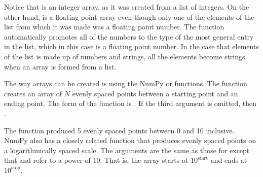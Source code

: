 \documentclass[letterpaper,10pt,english]{sphinxmanual}
\begin{document}
\sphinxAtStartPar
Notice that  is an integer array, as it was created from a list of integers.  On the other hand,  is a floating point array even though only one of the elements of the list from which it was made was a floating point number.  The  function automatically promotes all of the numbers to the type of the most general entry in the list, which in this case is a floating point number. In the case that elements of the list is made up of numbers and strings, all the elements become strings when an array is formed from a list.

\sphinxAtStartPar
The  way arrays can be created is using the NumPy  or  functions.  The  function creates an array of \(N\) evenly spaced points between a starting point and an ending point.  The form of the function is .  If the third argument  is omitted, then .

\begin{sphinxVerbatim}[commandchars=\\\{\}]
  
\PYG{p}{[}            \PYG{p}{]}
\end{sphinxVerbatim}

\sphinxAtStartPar
The  function produced 5 evenly spaced points between 0 and 10 inclusive.  NumPy also has a closely related function  that produces evenly spaced points on a logarithmically spaced scale.  The arguments are the same as those for  except that  and  refer to a power of 10.  That is, the array starts at \(10^{\mathrm{start}}\) and ends at \(10^{\mathrm{stop}}\).

\begin{sphinxVerbatim}[commandchars=\\\{\},numbers=left,firstnumber=1,stepnumber=1]
        

  
\PYG{p}{[}              \PYG{p}{]}
\end{sphinxVerbatim}
\end{document}
